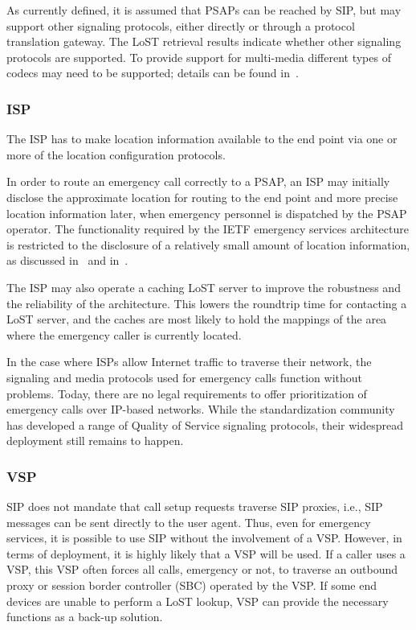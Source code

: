 \documentclass[12pt]{article}
\begin{document}
As currently defined, it is assumed that PSAPs can be reached by SIP, but may support other signaling protocols, either directly or through a protocol translation gateway.  The LoST retrieval results indicate whether other signaling protocols are supported. To provide support for multi-media different types of codecs may need to be supported; details can be found in~\cite{draft-ietf-ecrit-phonebcp}.

\subsubsection{ISP\\}

The ISP has to make location information available to the end point via one or more of the location configuration protocols.

In order to route an emergency call correctly to a PSAP, an ISP may initially disclose the approximate location for routing to the end point and more precise location information later, when emergency personnel is dispatched by the PSAP operator.  The functionality required by the IETF emergency services architecture is restricted to the disclosure of a relatively small amount of location information, as discussed in~\cite{rfc6444} and in~\cite{draft-ietf-ecrit-rough-loc}.

The ISP may also operate a caching LoST server to improve the robustness and the reliability of the architecture. This lowers the roundtrip time for contacting a LoST server, and the caches are most likely to hold the mappings of the area where the emergency caller is currently located.  

In the case where ISPs allow Internet traffic to traverse their network, the signaling and media protocols used for emergency calls function without problems. Today, there are no legal requirements to offer prioritization of emergency calls over IP-based networks. While the standardization community has developed a range of Quality of Service signaling protocols, their widespread deployment still remains to happen.

\subsubsection{VSP\\}

SIP does not mandate that call setup requests traverse SIP proxies, i.e., SIP messages can be sent directly to the user agent. Thus, even for emergency services, it is possible to use SIP without the involvement of a VSP.  However, in terms of deployment, it is highly likely that a VSP will be used. If a caller uses a VSP, this VSP often forces all calls, emergency or not, to traverse an outbound proxy or session border controller (SBC) operated by the VSP.  If some end devices are unable to perform a LoST lookup, VSP can provide the necessary functions as a back-up solution. 
\end{document}
